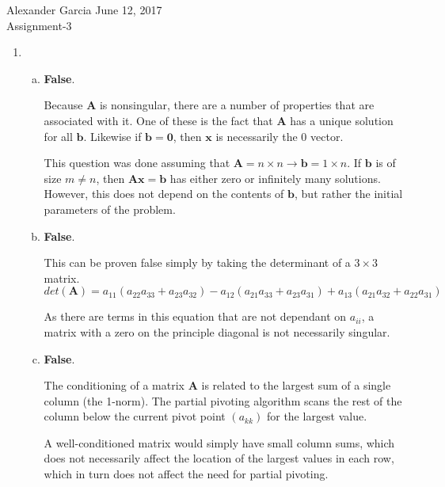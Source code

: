 \documentclass[11pt]{article}
\begin{document}
\lstset{stringstyle=\ttfamily,
	showstringspaces=false,
	basicstyle=\small}

\begin{center} Alexander Garcia \hfill June 12, 2017 \\ Assignment-3 \end{center}

\medskip

\begin{enumerate}

	\item
	\begin{enumerate}[(a)]

		\item \textbf{False}.

		Because $\mathbf{A}$ is nonsingular, there are a number of properties that are associated with it. One of these is the fact that $\mathbf{A}$
		has a unique solution for all $\mathbf{b}$. Likewise if $\mathbf{b = 0}$, then $\mathbf{x}$ is necessarily the 0
		vector.

		This question was done assuming that $\mathbf{A}=n\times n \rightarrow \mathbf{b}=1\times n$. If $\mathbf{b}$ is of size $m\neq n$, then $\mathbf{Ax=b}$ has
		either zero or infinitely many solutions. However, this does not depend on the contents of $\mathbf{b}$, but rather the initial parameters of the problem. \\

		\item \textbf{False}.

		This can be proven false simply by taking the determinant of a $3\times 3$ matrix.
		$$det(\mathbf{A}) = a_{11}(a_{22}a_{33} + a_{23}a_{32}) - a_{12}(a_{21}a_{33} + a_{23}a_{31}) + a_{13}(a_{21}a_{32} + a_{22}a_{31})$$

		As there are terms in this equation that are not dependant on $a_{ii}$, a matrix with a zero on the principle diagonal is not necessarily singular.\\

		\item \textbf{False}.

		The conditioning of a matrix $\mathbf{A}$ is related to the largest sum of a single column (the 1-norm). The partial pivoting algorithm scans the rest of the
		column below the current pivot point $(a_{kk})$ for the largest value.

		A well-conditioned matrix would simply have small column sums, which does not necessarily affect the location of the largest values in each row, which in turn
		does not affect the need for partial pivoting. \\


\end{enumerate}
\end{enumerate}
\end{document}

